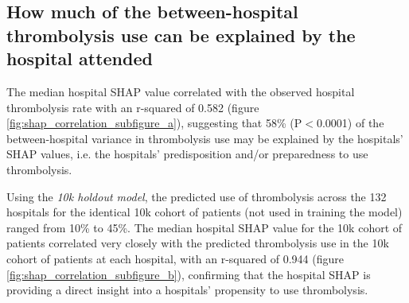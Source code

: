\subsection{How much of the between-hospital thrombolysis use can be explained by the hospital attended}

The median hospital SHAP value correlated with the observed hospital thrombolysis rate with an r-squared of 0.582 (figure \ref{fig:shap_correlation_subfigure_a}), suggesting that 58\% (P$<$0.0001) of the between-hospital variance in thrombolysis use may be explained by the hospitals' SHAP values, i.e. the hospitals' predisposition and/or preparedness to use thrombolysis. %

Using the \emph{10k holdout model}, the predicted use of thrombolysis across the 132 hospitals for the identical 10k cohort of patients (not used in training the model) ranged from 10\% to 45\%. The median hospital SHAP value for the 10k cohort of patients correlated very closely with the predicted thrombolysis use in the 10k cohort of patients at each hospital, with an r-squared of 0.944 (figure \ref{fig:shap_correlation_subfigure_b}), confirming that the hospital SHAP is providing a direct insight into a hospitals' propensity to use thrombolysis.


